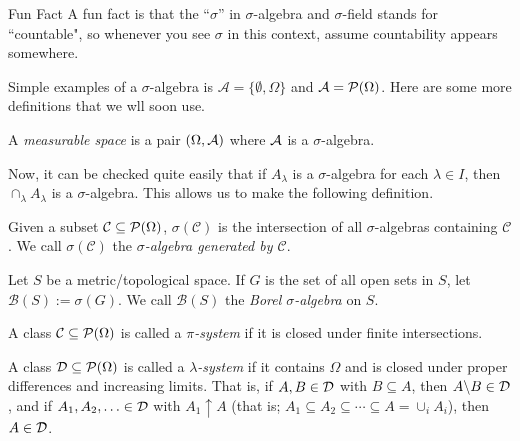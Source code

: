 \begin{remark}{Fun Fact}
    A fun fact is that the ``$\sigma$'' in $\sigma$-algebra and $\sigma$-field stands for ``countable", so whenever you see $\sigma$ in this context, assume countability appears somewhere. 
\end{remark}

Simple examples of a $\sigma$-algebra is $\mathcal{A} = \{\emptyset, \Omega\}$ and $\mathcal{A} = \P(\Omega)$. Here are some more definitions that we wll soon use.

\begin{definition}
    A \emph{measurable space} is a pair $(\Omega, \A)$ where $\A$ is a $\sigma$-algebra. 
\end{definition}

Now, it can be checked quite easily that if $A_{\lambda}$ is a $\sigma$-algebra for each $\lambda \in I$, then $\cap_{\lambda} A_{\lambda}$ is a $\sigma$-algebra. This allows us to make the following definition.

\begin{definition}
    Given a subset $\mathcal{C} \subseteq \P(\Omega)$, $\sigma(\mathcal{C})$ is the intersection of all $\sigma$-algebras containing $\mathcal{C}$. We call $\sigma(\mathcal{C})$ the \emph{$\sigma$-algebra generated by $\mathcal{C}$}. 
\end{definition}

\begin{definition}
    Let $S$ be a metric/topological space. If $G$ is the set of all open sets in $S$, let $\mathcal{B}(S) := \sigma(G)$. We call $\mathcal{B}(S)$ the \emph{Borel $\sigma$-algebra} on $S$. 
\end{definition}

\begin{definition}
    A class $\mathcal{C} \subseteq \P(\Omega)$ is called a \emph{$\pi$-system} if it is closed under finite intersections.
\end{definition}

\begin{definition}
    A class $\mathcal{D} \subseteq \P(\Omega)$ is called a \emph{$\lambda$-system} if it contains $\Omega$ and is closed under proper differences and increasing limits. That is, if $A, B \in \cal{D}$ with $B \subseteq A$, then $A \backslash B \in \cal{D}$, and if $A_1, A_2, \ldots \in \cal{D}$ with $A_1 \uparrow A$ (that is; $A_1 \subseteq A_2 \subseteq \cdots \subseteq A = \cup_{i} A_i$), then $A \in \cal{D}$. 
\end{definition}

